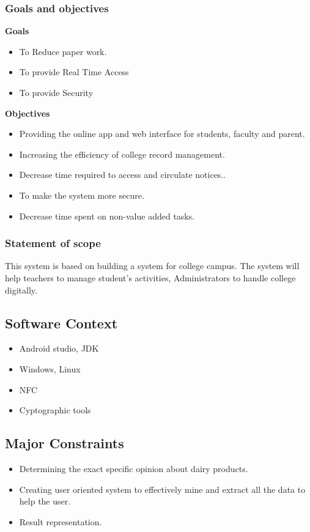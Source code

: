\documentclass[10pt,a4paper]
{article}
\numberwithin{table}{section}
\begin{document}
{{\begin{normalsize}
\subsubsection{Goals and objectives}
\hspace*{1cm}\textbf{Goals}
\begin{itemize}
\item To Reduce paper work.
\item To provide Real Time Access
\item To provide Security
\end{itemize}
\hspace*{1cm}\textbf{Objectives}
\begin{itemize}
\item Providing the online app and web interface for students, faculty and parent.
\item Increasing the efficiency of college record management.
\item Decrease time required to access and circulate notices..
\item To make the system more secure.
\item Decrease time spent on non-value added tasks.
\end{itemize}

\subsubsection{Statement of scope}
\hspace*{0.3cm}
{This system is based on building a system for college campus. The system will help teachers to manage student’s activities, Administrators to handle college digitally.
}

\subsection{Software Context}
\begin{itemize}
\item Android studio, JDK
\item Windows, Linux
\item NFC
\item Cyptographic tools
\end{itemize}


\subsection{Major Constraints}
\begin{itemize}
\item Determining the exact specific opinion about dairy products.
\item Creating user oriented system to effectively mine and extract all the data to help the user.
\item Result representation.
\end{itemize}



\end{normalsize}}}
\end{document}
